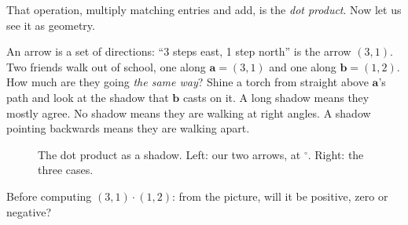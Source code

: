 That operation, multiply matching entries and add, is the \emph{dot product}. Now let us see it as geometry.

\Picture An arrow is a set of directions: ``3 steps east, 1 step north'' is the arrow $(3,1)$. Two friends walk
out of school, one along $\bm{a}=(3,1)$ and one along $\bm{b}=(1,2)$. How much are they going \emph{the same
way}? Shine a torch from straight above $\bm{a}$'s path and look at the shadow that $\bm{b}$ casts on it. A long
shadow means they mostly agree. No shadow means they are walking at right angles. A shadow pointing backwards
means they are walking apart.

\begin{figure}[h]
\centering
{}
\caption{The dot product as a shadow. Left: our two arrows, at \geoAng$^\circ$. Right: the three cases.}
\label{fig:dot}
\end{figure}

\Predict Before computing $(3,1)\cdot(1,2)$: from the picture, will it be positive, zero or negative?

